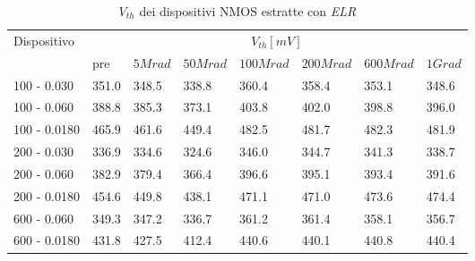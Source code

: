 \documentclass[
	a4paper,
	cleardoublepage=empty,
	headings=twolinechapter,
	numbers=autoenddot,
]{scrbook}
\begin{document}
\begin{table}[H]
  \renewcommand{\arraystretch}{1.3}
  \begin{tabular}{m{2.1cm} m{0.8cm} m{1.1cm} m{1.3cm} m{1.5cm} m{1.5cm} m{1.5cm} m{1cm}}
    \toprule
    \multirow{2}{*}{Dispositivo} & \multicolumn{7}{c}{$V_{th} [mV] $}                                                                    \\
    \cmidrule{2-8}
                                 & pre                                & $5Mrad$ & $50Mrad$ & $100Mrad$ & $200Mrad$ & $600Mrad$ & $1Grad$ \\
    \midrule
    100 - 0.030                     & 351.0                              & 348.5   & 338.8    & 360.4     & 358.4     & 353.1     & 348.6        \\
    \hline
    100 - 0.060                     & 388.8                              & 385.3   & 373.1    & 403.8     & 402.0     & 398.8     & 396.0        \\
    \hline
    100 - 0.0180                    & 465.9                              & 461.6   & 449.4    & 482.5     & 481.7     & 482.3     & 481.9        \\
    \hline
    200 - 0.030                     & 336.9                              & 334.6   & 324.6    & 346.0     & 344.7     & 341.3     & 338.7        \\
    \hline
    200 - 0.060                     & 382.9                              & 379.4   & 366.4    & 396.6     & 395.1     & 393.4     & 391.6   \\
    \hline
    200 - 0.0180                    & 454.6                              & 449.8   & 438.1    & 471.1     & 471.0     & 473.6     & 474.4        \\
    \hline
    600 - 0.060                     & 349.3                              & 347.2   & 336.7    & 361.2     & 361.4     & 358.1     & 356.7        \\
    \hline
    600 - 0.0180                    & 431.8                              & 427.5   & 412.4    & 440.6     & 440.1     & 440.8     & 440.4        \\
    \bottomrule
  \end{tabular}
  \caption{$V_{th}$ dei dispositivi NMOS estratte con \emph{ELR}}
  \label{tab:VthELRN}
\end{table}
\end{document}
